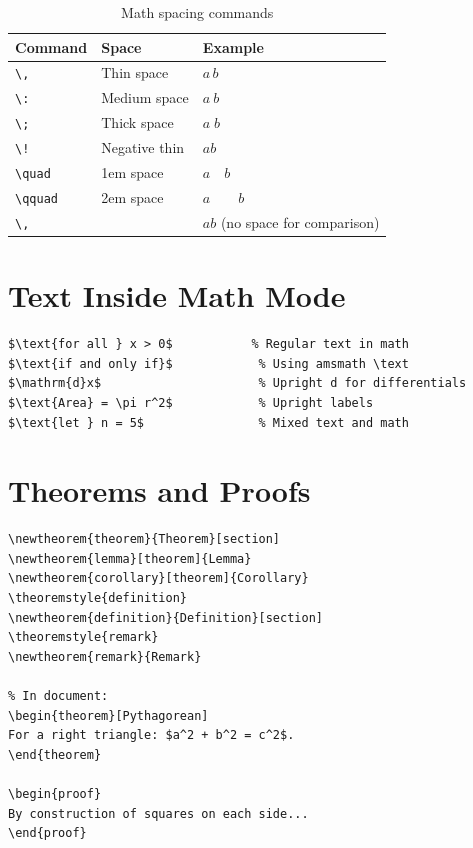 \begin{table}[H]
\centering
\begin{tabular}{lll}
\toprule
\textbf{Command} & \textbf{Space} & \textbf{Example} \\
\midrule
\verb|\,|     & Thin space      & $a\,b$ \\
\verb|\:|     & Medium space    & $a\:b$ \\
\verb|\;|     & Thick space     & $a\;b$ \\
\verb|\!|     & Negative thin   & $a\!b$ \\
\verb|\quad|  & 1em space       & $a\quad b$ \\
\verb|\qquad| & 2em space       & $a\qquad b$ \\
\verb|\,|     & & $ab$ (no space for comparison) \\
\bottomrule
\end{tabular}
\caption{Math spacing commands}
\end{table}

\section{Text Inside Math Mode}

\begin{lstlisting}[language={[LaTeX]TeX}, caption=Text in math]
$\text{for all } x > 0$           % Regular text in math
$\text{if and only if}$            % Using amsmath \text
$\mathrm{d}x$                      % Upright d for differentials
$\text{Area} = \pi r^2$            % Upright labels
$\text{let } n = 5$                % Mixed text and math
\end{lstlisting}

\section{Theorems and Proofs}

\begin{lstlisting}[language={[LaTeX]TeX}, caption=Theorem environments]
% In preamble (amsthm package):
\newtheorem{theorem}{Theorem}[section]
\newtheorem{lemma}[theorem]{Lemma}
\newtheorem{corollary}[theorem]{Corollary}
\theoremstyle{definition}
\newtheorem{definition}{Definition}[section]
\theoremstyle{remark}
\newtheorem{remark}{Remark}

% In document:
\begin{theorem}[Pythagorean]
For a right triangle: $a^2 + b^2 = c^2$.
\end{theorem}

\begin{proof}
By construction of squares on each side...
\end{proof}
\end{lstlisting}

